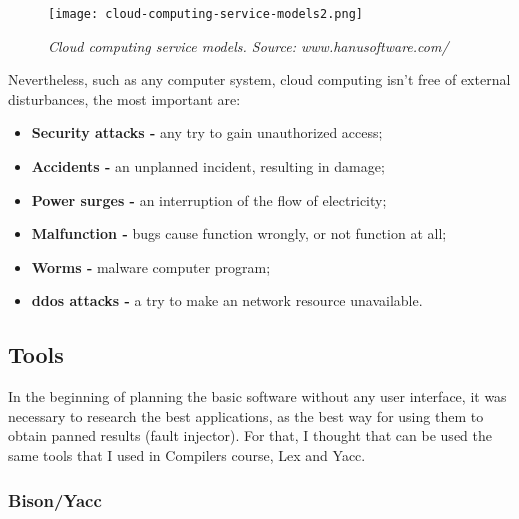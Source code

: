\begin{figure}[!ht]
\begin{center}
\texttt{[image: cloud-computing-service-models2.png]}
\caption{\small \sl Cloud computing service models. \textit{Source: www.hanusoftware.com/}\label{fig:cloudcomputingservicemodels}}
\end{center}
\end{figure}

Nevertheless, such as any computer system, cloud computing isn't free of external disturbances\cite{wolter2012resilience}, the most important are:
\begin{itemize}
 	\item \textbf{Security attacks - } any try to gain unauthorized access;
 	\item \textbf{Accidents - } an unplanned incident, resulting in damage;
 	\item \textbf{Power surges - } an interruption of the flow of electricity;
 	\item \textbf{Malfunction - } bugs cause function wrongly, or not function at all;
 	\item \textbf{Worms - } malware computer program;
 	\item \textbf{\acl{ddos} attacks - } a try to make an network resource unavailable.
 \end{itemize}

\clearpage
\subsection{Tools}

In the beginning of planning the basic software without any user interface, it was necessary to research the best applications, as the best way for using them to obtain panned results (fault injector).
For that, I thought that can be used the same tools that I used in Compilers course, Lex and Yacc.\\




\subsubsection{Bison/Yacc}
\hypertarget{Bison/Yacc}{}

